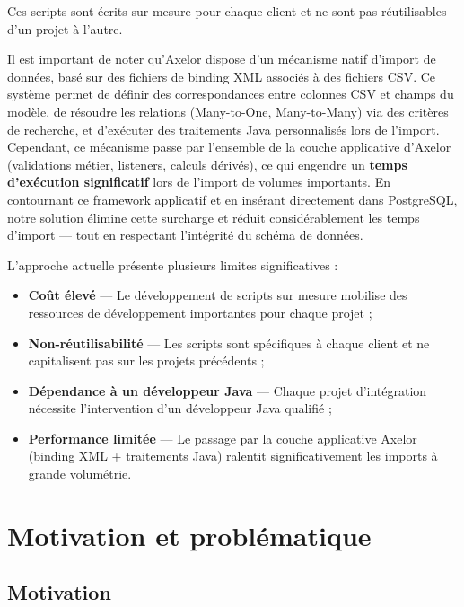Ces scripts sont écrits sur mesure pour chaque client et ne sont pas réutilisables d'un projet à l'autre.

Il est important de noter qu'Axelor dispose d'un mécanisme natif d'import de données, basé sur des fichiers de binding XML associés à des fichiers CSV. Ce système permet de définir des correspondances entre colonnes CSV et champs du modèle, de résoudre les relations (Many-to-One, Many-to-Many) via des critères de recherche, et d'exécuter des traitements Java personnalisés lors de l'import. Cependant, ce mécanisme passe par l'ensemble de la couche applicative d'Axelor (validations métier, listeners, calculs dérivés), ce qui engendre un \textbf{temps d'exécution significatif} lors de l'import de volumes importants. En contournant ce framework applicatif et en insérant directement dans PostgreSQL, notre solution élimine cette surcharge et réduit considérablement les temps d'import — tout en respectant l'intégrité du schéma de données.

L'approche actuelle présente plusieurs limites significatives :
\begin{itemize}
    \item \textbf{Coût élevé} — Le développement de scripts sur mesure mobilise des ressources de développement importantes pour chaque projet ;
    \item \textbf{Non-réutilisabilité} — Les scripts sont spécifiques à chaque client et ne capitalisent pas sur les projets précédents ;
    \item \textbf{Dépendance à un développeur Java} — Chaque projet d'intégration nécessite l'intervention d'un développeur Java qualifié ;
    \item \textbf{Performance limitée} — Le passage par la couche applicative Axelor (binding XML + traitements Java) ralentit significativement les imports à grande volumétrie.
\end{itemize}

\section{Motivation et problématique}
\label{sec:motivation}

\subsection{Motivation}

